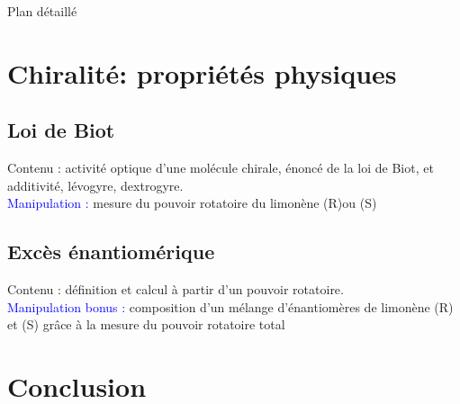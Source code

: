 \begin{reportBlock}{Plan détaillé}
\section{Chiralité: propriétés physiques}

\subsection{Loi de Biot}
Contenu : activité optique d’une molécule chirale, énoncé de la loi de Biot, et additivité, lévogyre, dextrogyre.\\

\textcolor{blue}{Manipulation :} mesure du pouvoir rotatoire du limonène (R)ou (S)

\subsection{Excès énantiomérique}
Contenu : définition et calcul à partir d’un pouvoir rotatoire.\\

\textcolor{blue}{Manipulation bonus :} composition d’un mélange d’énantiomères de limonène (R) et (S) grâce à la mesure du pouvoir rotatoire total


\section{}

\subsection{}






\section{Conclusion} 


\end{reportBlock}





